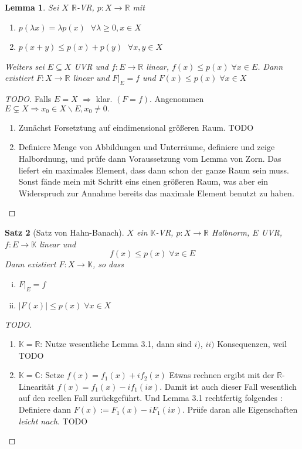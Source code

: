 \documentclass[ngerman]{report}
\theoremstyle{plain}%
\newtheorem{thm}{Satz}[chapter]
\newtheorem{lemma}[thm]{Lemma}
\theoremstyle{definition}%
\theoremstyle{myStyle}
\newcommand{\C}{\mathbb{C}}
\newcommand{\R}{\mathbb{R}}
\newcommand{\K}{\mathbb{K}}
\newcommand{\df}[1][]{%
	\overset{#1}{\Rightarrow}
}
\begin{document}
	\begin{lemma}
		Sei $X$ $\R$-VR, $p : X \to \R$ mit 
			\begin{enumerate}[1)]
							\item $p(\lambda x) = \lambda p(x)$ $\; \forall \lambda \geq 0, x\in X$
							\item $p(x + y) \leq p(x) + p(y)$ $\; \forall x,y \in X$
			\end{enumerate}
 Weiters sei $E \subseteq X$ UVR und $f: E \to \R$ linear, $f(x) \leq p(x) \; \forall x \in E$. 
 Dann existiert $F: X\to \R$ linear und $F|_{E} = f$ und $F(x) \leq p(x) \; \forall x \in X$
	\end{lemma}

	\begin{proof}[TODO]
		Falls $E = X$ $\df$ klar. $(F = f)$.	Angenommen $E \subsetneq X \df x_0 \in X\backslash E, x_0 \neq 0.$

		\begin{enumerate}[1 {Schritt:}]
			\item Zunächst Forsetztung auf eindimensional größeren Raum. TODO 
			\item Definiere Menge von Abbildungen und Unterräume, definiere und zeige Halbordnung, und prüfe dann Voraussetzung vom Lemma von Zorn. Das liefert ein maximales Element, dass dann schon der ganze Raum sein muss. Sonst fände mein mit Schritt eins einen größeren Raum, was aber ein Widerspruch zur Annahme bereits das maximale Element benutzt zu haben. 	
		\end{enumerate}
	\end{proof}

	\begin{thm}[Satz von Hahn-Banach]
		$X$ ein $\K$-VR, $p: X \to \R$ Halbnorm, $E$ UVR, $f: E \to \K$ linear und
			$$ f(x) \leq p(x) \; \forall x \in E$$
	Dann existiert $F: X \to \K$, so dass 
		\begin{enumerate}[(i)]
			\item $F|_E = f$
			\item $|F(x)| \leq p(x) \; \forall x \in X$
		\end{enumerate}
	\end{thm}

	\begin{proof}[TODO]
		\begin{enumerate}[{Fall} 1]
			\item $\K = \R$: Nutze wesentliche Lemma 3.1, dann sind $i)$, $ii)$ Konsequenzen, weil TODO
			\item $\K = \C$: Setze $f(x) = f_1(x) + i f_2(x)$ Etwas rechnen ergibt mit der $\R$-Linearität 
				$f(x) = f_1(x) - i f_1(ix)$. Damit ist auch dieser Fall wesentlich auf den reellen Fall zurückgeführt. Und Lemma 3.1 rechtfertig folgendes :
				Definiere dann $F(x) := F_1(x) - i F_1(ix)$. Prüfe daran alle Eigenschaften \textit{leicht nach}.
				TODO
		\end{enumerate}
	\end{proof}
\end{document}
